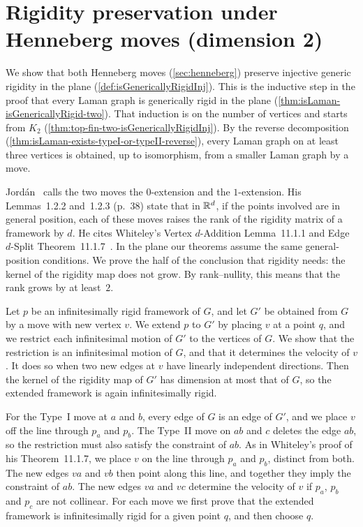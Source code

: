 \section{Rigidity preservation under Henneberg moves (dimension 2)}
\label{sec:henneberg-rigidity}

We show that both Henneberg moves (\cref{sec:henneberg}) preserve
injective generic rigidity in the plane
(\cref{def:isGenericallyRigidInj}). This is the inductive step in the
proof that every Laman graph is generically rigid in the plane
(\cref{thm:isLaman-isGenericallyRigid-two}). That induction is on the
number of vertices and starts from $K_2$
(\cref{thm:top-fin-two-isGenericallyRigidInj}). By the reverse
decomposition (\cref{thm:isLaman-exists-typeI-or-typeII-reverse}),
every Laman graph on at least three vertices is obtained, up to
isomorphism, from a smaller Laman graph by a move.

Jord\'an~\cite{jordan2016} calls the two moves the $0$-extension and
the $1$-extension. His Lemmas~1.2.2 and~1.2.3 (p.~38) state that in
${\mathbb{R}}^{d}$, if the points involved are in general position, each of
these moves raises the rank of the rigidity matrix of a framework by
$d$. He cites Whiteley's Vertex $d$-Addition Lemma~11.1.1 and Edge
$d$-Split Theorem~11.1.7~\cite{whiteley1996}. In the plane our
theorems assume the same general-position conditions. We prove the
half of the conclusion that rigidity needs: the kernel of the rigidity
map does not grow. By rank--nullity, this means that the rank grows by
at least~$2$.

Let $p$ be an infinitesimally rigid framework of $G$, and let $G'$ be
obtained from $G$ by a move with new vertex $v$. We extend $p$ to
$G'$ by placing $v$ at a point $q$, and we restrict each
infinitesimal motion of $G'$ to the vertices of $G$. We show that the
restriction is an infinitesimal motion of $G$, and that it determines
the velocity of $v$. It does so when two new edges at $v$ have
linearly independent directions. Then the kernel of the rigidity map
of $G'$ has dimension at most that of $G$, so the extended framework
is again infinitesimally rigid.

For the Type~I move at $a$ and $b$, every edge of $G$ is an edge of
$G'$, and we place $v$ off the line through $p_a$ and $p_b$. The
Type~II move on $ab$ and $c$ deletes the edge $ab$, so the
restriction must also satisfy the constraint of $ab$. As in
Whiteley's proof of his Theorem~11.1.7, we place $v$ on the line
through $p_a$ and $p_b$, distinct from both. The new edges $va$ and
$vb$ then point along this line, and together they imply the
constraint of $ab$. The new edges $va$ and $vc$ determine the
velocity of $v$ if $p_a$, $p_b$ and $p_c$ are not collinear. For each
move we first prove that the extended framework is infinitesimally
rigid for a given point $q$, and then choose $q$.


